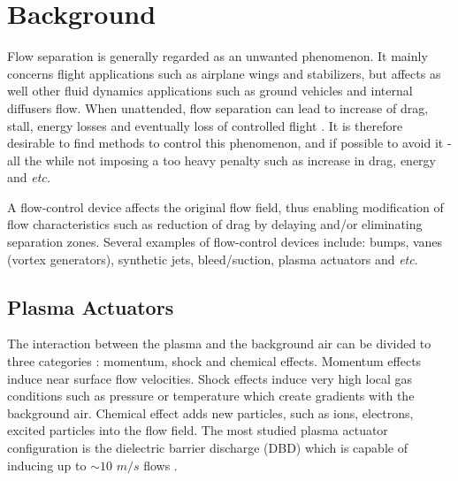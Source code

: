 \documentclass[10pt,a4paper]{article}
\begin{document}


\section{Background}
Flow separation is generally regarded as an unwanted phenomenon. It mainly concerns flight applications such as airplane wings and stabilizers, but affects as well other fluid dynamics applications such as ground vehicles and internal diffusers flow. When unattended, flow separation can lead to increase of drag, stall, energy losses and eventually loss of controlled flight \cite{SIMPSON}. It is therefore desirable to find methods to control this phenomenon, and if possible to avoid it - all the while not imposing a too heavy penalty such as increase in drag, energy and \textit{etc.}  
\par A flow-control device affects the original flow field, thus enabling modification of flow characteristics such as reduction of drag by delaying and/or eliminating separation zones. Several examples of flow-control devices include: bumps, vanes (vortex generators), synthetic jets, bleed/suction, plasma actuators and \textit{etc}.
\subsection{Plasma Actuators}
The interaction between the plasma and the background air can be divided to three categories \cite{FLOWCTRL}: momentum, shock and chemical effects. Momentum effects induce near surface flow velocities. Shock effects induce very high local gas conditions such as pressure or temperature which create gradients with the background air. Chemical effect adds new particles, such as ions, electrons, excited particles into the flow field. The most studied plasma actuator configuration is the dielectric barrier discharge (DBD) which is capable of inducing up to $\sim10$ $m/s$ flows \cite{FLOWCTRL,KOK,WHALLEY,MOREAU}.
\end{document}
